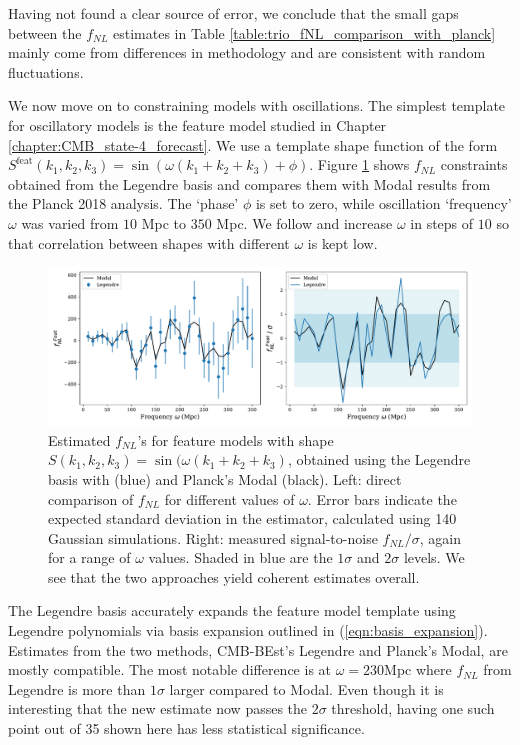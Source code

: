 Having not found a clear source of error, we conclude that the small gaps between the $f_{NL}$ estimates in Table \ref{table:trio_fNL_comparison_with_planck} mainly come from differences in methodology and are consistent with random fluctuations.

We now move on to constraining models with oscillations. The simplest template for oscillatory models is the feature model studied in Chapter \ref{chapter:CMB_state-4_forecast}. We use a template shape function of the form $S^\text{feat}(k_1,k_2,k_3) = \sin(\omega (k_1 + k_2 + k_3) + \phi)$. Figure \ref{fig:sine_template_frequency_Legendre_Modal} shows $f_{NL}$ constraints obtained from the Legendre basis and compares them with Modal results from the Planck 2018 analysis. The `phase' $\phi$ is set to zero, while oscillation `frequency' $\omega$ was varied from $10$ Mpc to $350$ Mpc. We follow \cite{Fergusson2015a} and increase $\omega$ in steps of $10$ so that correlation between shapes with different $\omega$ is kept low.

\begin{figure}[htbp!] 
	\centering    
	\includegraphics[width=\textwidth]{sine_template_frequency_Legendre_Modal.pdf}
	\caption{Estimated $f_{NL}$'s for feature models with shape $S(k_1,k_2,k_3) = \sin(\omega (k_1 + k_2 + k_3)$, obtained using the Legendre basis with (blue) and Planck's Modal (black). Left: direct comparison of $f_{NL}$ for different values of $\omega$. Error bars indicate the expected standard deviation in the estimator, calculated using 140 Gaussian simulations. Right: measured signal-to-noise $f_{NL}/\sigma$, again for a range of $\omega$ values. Shaded in blue are the $1\sigma$ and $2\sigma$ levels. We see that the two approaches yield coherent estimates overall.}
	\label{fig:sine_template_frequency_Legendre_Modal}
\end{figure}

The Legendre basis accurately expands the feature model template using Legendre polynomials via basis expansion outlined in (\ref{eqn:basis_expansion}). Estimates from the two methods, CMB-BEst's Legendre and Planck's Modal, are mostly compatible. The most notable difference is at $\omega=230$Mpc where $f_{NL}$ from Legendre is more than $1\sigma$ larger compared to Modal. Even though it is interesting that the new estimate now passes the $2\sigma$ threshold, having one such point out of 35 shown here has less statistical significance.

